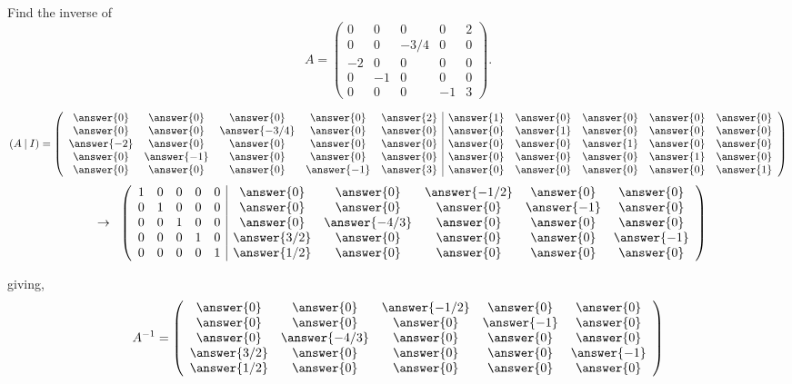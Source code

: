 \documentclass{ximera}
\author{Parisa Fatheddin}
\author{Parisa Fatheddin}
\begin{document}
\begin{exercise}

Find the inverse of
\[A = \left(\begin{array}{ccccc}
0 & 0& 0& 0& 2\\
0 & 0& -3/4& 0& 0\\
-2 & 0& 0& 0& 0\\
0 & -1& 0& 0& 0\\
0 & 0& 0& -1& 3
\end{array}\right).
\]

\begin{prompt}
\[ (A \hspace{.08cm}| \hspace{.08cm} I)=
\left(\begin{array}{ccccc|ccccc}
\answer{0} & \answer{0} & \answer{0} & \answer{0} & \answer{2} & \answer{1} & \answer{0} & \answer{0} & \answer{0}& \answer{0}\\
\answer{0} & \answer{0} & \answer{-3/4} & \answer{0} & \answer{0} & \answer{0} & \answer{1} & \answer{0} & \answer{0} & \answer{0}\\
\answer{-2} & \answer{0} & \answer{0} & \answer{0} & \answer{0} & \answer{0} & \answer{0} & \answer{1} & \answer{0} & \answer{0}\\
\answer{0} & \answer{-1} & \answer{0} & \answer{0} & \answer{0}& \answer{0} & \answer{0} & \answer{0} & \answer{1} & \answer{0}\\
\answer{0} & \answer{0} & \answer{0} & \answer{-1} & \answer{3}& \answer{0} & \answer{0} & \answer{0} & \answer{0} & \answer{1}
\end{array}\right)
\]
\[
\hspace{.2cm} \rightarrow \hspace{.2cm}
\left(\begin{array}{ccccc|ccccc}
1 & 0& 0& 0& 0 & \answer{0} & \answer{0} & \answer{-1/2} & \answer{0} & \answer{0}\\
0 & 1& 0& 0& 0 & \answer{0} & \answer{0} & \answer{0} & \answer{-1} & \answer{0}\\
0 & 0& 1& 0& 0 & \answer{0} & \answer{-4/3} & \answer{0} & \answer{0} & \answer{0}\\
0 & 0& 0& 1& 0 & \answer{3/2} & \answer{0} & \answer{0} & \answer{0} & \answer{-1}\\
0 & 0& 0& 0& 1 & \answer{1/2} & \answer{0} & \answer{0} & \answer{0} & \answer{0}
\end{array}\right)
\]

giving,
\[
A^{-1} = \left(\begin{array}{ccccc}
\answer{0} & \answer{0} & \answer{-1/2} & \answer{0} & \answer{0}\\
 \answer{0} & \answer{0} & \answer{0} & \answer{-1} & \answer{0}\\
 \answer{0} & \answer{-4/3} & \answer{0} & \answer{0} & \answer{0}\\
 \answer{3/2} & \answer{0} & \answer{0} & \answer{0} & \answer{-1}\\
 \answer{1/2} & \answer{0} & \answer{0} & \answer{0} & \answer{0}
\end{array}\right)
\]

\end{prompt}
\end{exercise}
\end{document}

